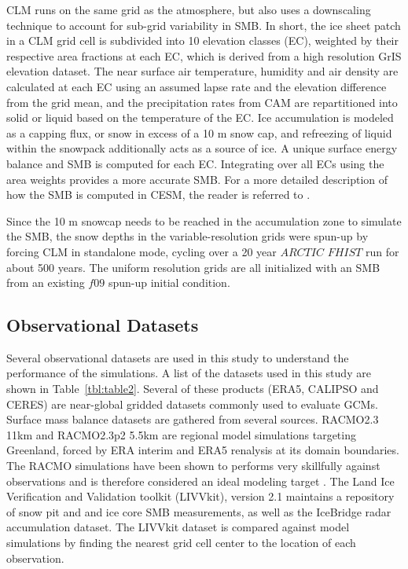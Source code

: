 \documentclass[draft]{agujournal2019}
\begin{document}
CLM runs on the same grid as the atmosphere, but also uses a downscaling technique to account for sub-grid variability in SMB. In short, the ice sheet patch in a CLM grid cell is subdivided into 10 elevation classes (EC), weighted by their respective area fractions at each EC, which is derived from a high resolution GrIS elevation dataset. The near surface air temperature, humidity and air density are calculated at each EC using an assumed lapse rate and the elevation difference from the grid mean, and the precipitation rates from CAM are repartitioned into solid or liquid based on the temperature of the EC. Ice accumulation is modeled as a capping flux, or snow in excess of a 10 m snow cap, and refreezing of liquid within the snowpack additionally acts as a source of ice. A unique surface energy balance and SMB is computed for each EC. Integrating over all ECs using the area weights provides a more accurate SMB. For a more detailed description of how the SMB is computed in CESM, the reader is referred to \cite{CISM1,SETAL2019TC,KETAL2020JAMES}. 

Since the 10 m snowcap needs to be reached in the accumulation zone to simulate the SMB, the snow depths in the variable-resolution grids were spun-up by forcing CLM in standalone mode, cycling over a 20 year $ARCTIC$ $FHIST$ run for about 500 years. The uniform resolution grids are all initialized with an SMB from an existing $f09$ spun-up initial condition.

\subsection{Observational Datasets}

Several observational datasets are used in this study to understand the performance of the simulations. A list of the datasets used in this study are shown in Table~\ref{tbl:table2}. Several of these products (ERA5, CALIPSO and CERES) are near-global gridded datasets commonly used to evaluate GCMs. Surface mass balance datasets are gathered from several sources. RACMO2.3 11km and RACMO2.3p2 5.5km are regional model simulations targeting Greenland, forced by ERA interim and ERA5 renalysis at its domain boundaries. The RACMO simulations have been shown to performs very skillfully against observations and is therefore considered an ideal modeling target \cite{NETAL2015TC,NETAL2019SCIENCE}. The Land Ice Verification and Validation toolkit (LIVVkit), version 2.1 \cite{LIVVkit} maintains a repository of snow pit and and ice core SMB measurements, as well as the IceBridge radar accumulation dataset. The LIVVkit dataset is compared against model simulations by finding the nearest grid cell center to the location of each observation.
\end{document}
